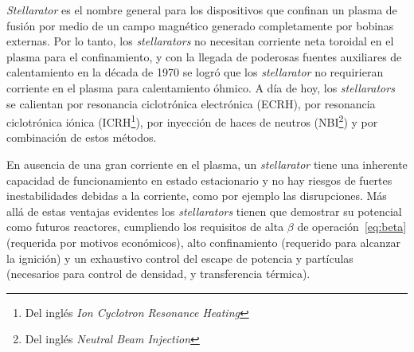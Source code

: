 \textit{Stellarator} es el nombre general para los dispositivos que confinan un plasma de fusión por medio de un campo magnético generado completamente por
bobinas externas. Por lo tanto, los \textit{stellarators} no necesitan corriente neta toroidal en el plasma para el confinamiento, y con la llegada de poderosas
fuentes auxiliares de calentamiento en la década de 1970 se logró que los \textit{stellarator} no requirieran corriente en el plasma para calentamiento óhmico. A
día de hoy, los \textit{stellarators} se calientan por resonancia ciclotrónica electrónica
(ECRH), por resonancia ciclotrónica iónica (ICRH\footnote{Del inglés \textit{Ion Cyclotron Resonance Heating}}), por inyección de haces
de neutros (NBI\footnote{Del inglés \textit{Neutral Beam Injection}}) y por combinación de estos métodos.\par
En ausencia de una gran corriente en el plasma, un \textit{stellarator} tiene una
inherente capacidad de funcionamiento en estado estacionario y no hay riesgos de fuertes inestabilidades debidas a la corriente, como por ejemplo las
disrupciones. Más allá de estas ventajas evidentes los \textit{stellarators} tienen que
demostrar su potencial como futuros reactores, cumpliendo los requisitos de
alta $\beta$ de operación~\ref{eq:beta}
(requerida por motivos económicos), alto confinamiento (requerido
para alcanzar la ignición) y un exhaustivo control del escape de potencia y
partículas (necesarios para control de densidad, y transferencia térmica).
